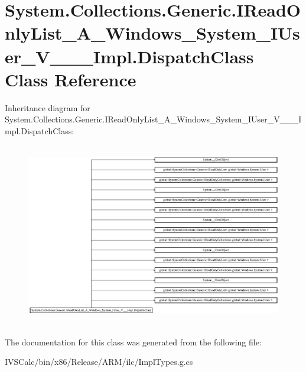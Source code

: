 \hypertarget{class_system_1_1_collections_1_1_generic_1_1_i_read_only_list___a___windows___system___i_user___v_______impl_1_1_dispatch_class}{}\section{System.\+Collections.\+Generic.\+I\+Read\+Only\+List\+\_\+\+A\+\_\+\+Windows\+\_\+\+System\+\_\+\+I\+User\+\_\+\+V\+\_\+\+\_\+\+\_\+\+Impl.\+Dispatch\+Class Class Reference}
\label{class_system_1_1_collections_1_1_generic_1_1_i_read_only_list___a___windows___system___i_user___v_______impl_1_1_dispatch_class}
Inheritance diagram for System.\+Collections.\+Generic.\+I\+Read\+Only\+List\+\_\+\+A\+\_\+\+Windows\+\_\+\+System\+\_\+\+I\+User\+\_\+\+V\+\_\+\+\_\+\+\_\+\+Impl.\+Dispatch\+Class\+:\begin{figure}[H]
\begin{center}
\leavevmode
\includegraphics[height=8.057554cm]{class_system_1_1_collections_1_1_generic_1_1_i_read_only_list___a___windows___system___i_user___v_______impl_1_1_dispatch_class}
\end{center}
\end{figure}


The documentation for this class was generated from the following file\+:\begin{DoxyCompactItemize}
\item 
I\+V\+S\+Calc/bin/x86/\+Release/\+A\+R\+M/ilc/Impl\+Types.\+g.\+cs\end{DoxyCompactItemize}
